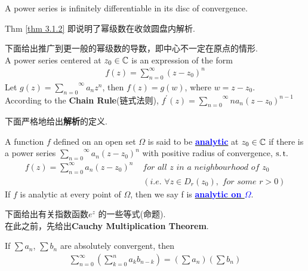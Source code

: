 	\begin{corollary}\label{cor 3.1.3}
		A power series is infinitely differentiable in its disc of convergence.
		
		\begin{rmk}
			Thm \ref{thm 3.1.2} 即说明了幂级数在收敛圆盘内解析.
		\end{rmk}
	\end{corollary}

	\vspace{2em}
	下面给出推广到更一般的幂级数的导数，即中心不一定在原点的情形.\\
	A power series centered at $z_0 \in \mathbb{C}$ is an expression of the form
	\begin{align}
		f(z) = \sum_{n = 0}^{\infty}{(z - z_0)^n}
	\end{align}
	Let $g(z) = \overset{\infty}{\underset{n = 0}{\sum}}{a_n z^n}$, then $f(z) = g(w)$, where $w = z - z_0$.\\
	According to the \textbf{Chain Rule}(链式法则), $f^{'}(z) = \overset{\infty}{\underset{n = 0}{\sum}}{n a_n (z - z_0)^{n - 1}}$
	
	\vspace{2em}
	下面严格地给出\textbf{解析}的定义.
	\begin{defn}\label{def 3.1.1}
		A function $f$ defined on an open set $\Omega$ is said to be \underline{\textcolor{blue}{\textbf{analytic}}} at $z_0 \in \mathbb{C}$ if there is a power series $\overset{\infty}{\underset{n = 0}{\sum}}{a_n (z - z_0)^n}$ with positive radius of convergence, $\operatorname{s.t.}$
		\begin{align}
			f(z) = \sum_{n = 0}^{\infty}{a_n (z - z_0)^n} \,\, &for \,\, all \,\, z \,\, in \,\, a \,\, neighbourhood \,\, of \,\, z_0 \\
			&(i.e. \,\, \forall z \in D_{r}(z_0) , \,\, for \,\, some \,\, r > 0)
		\end{align}
		If $f$ is analytic at every point of $\Omega$, then we say f is \underline{\textcolor{blue}{\textbf{analytic on $\Omega$}}}.
	\end{defn}

	\newpage
	下面给出有关指数函数$e^z$ 的一些等式(命题).\\
	在此之前，先给出\textbf{Cauchy Multiplication Theorem}.
	\begin{lemma}\label{lemma 3.1.4}
		If $\sum{a_n}$, $\sum{b_n}$ are absolutely convergent, then
		\begin{align}
			\sum_{n = 0}^{\infty}{\left( \sum_{k = 0}^{n}{a_k b_{n - k}} \right)} = \left( \sum{a_n} \right) \left( \sum{b_n} \right)
		\end{align}
	\end{lemma}
	
